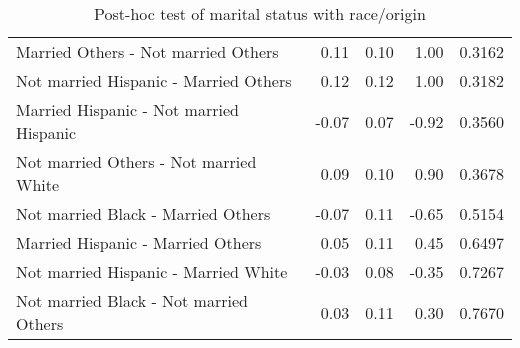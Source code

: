 \documentclass[11pt]{extarticle} %
\begin{document}
\begin{table}[H]
\begin{tabular}{lrrrr}
    Married Others -  Not married Others & 0.11 & 0.10 & 1.00 & 0.3162 \\ 
    Not married Hispanic -  Married Others & 0.12 & 0.12 & 1.00 & 0.3182 \\ 
    Married Hispanic -  Not married Hispanic & -0.07 & 0.07 & -0.92 & 0.3560 \\ 
    Not married Others -  Not married White & 0.09 & 0.10 & 0.90 & 0.3678 \\ 
    Not married Black -  Married Others & -0.07 & 0.11 & -0.65 & 0.5154 \\ 
    Married Hispanic -  Married Others & 0.05 & 0.11 & 0.45 & 0.6497 \\ 
    Not married Hispanic -  Married White & -0.03 & 0.08 & -0.35 & 0.7267 \\ 
    Not married Black -  Not married Others & 0.03 & 0.11 & 0.30 & 0.7670 \\ 
  \hline
\end{tabular}
\caption{Post-hoc test of marital status with race/origin} 
\label{tab:DisabMSRaceOrigin}
\end{table}
\end{document}
